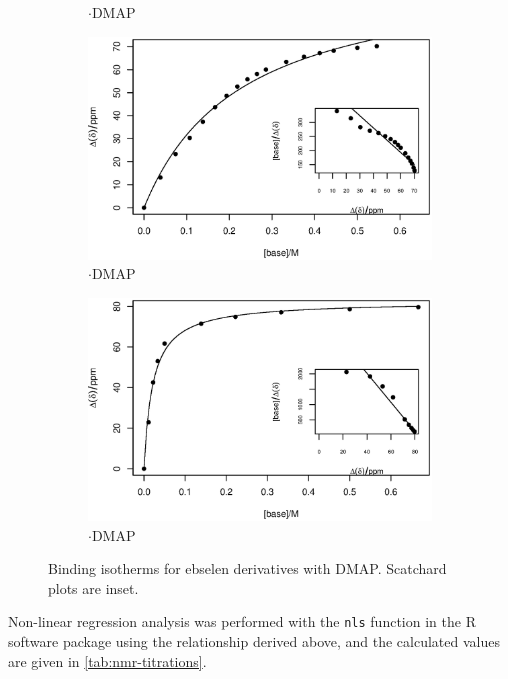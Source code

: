 \begin{refsection}
\begin{figure}
\begin{subfigure}{0.45\linewidth}
    \caption{$\cdot$DMAP}
  \end{subfigure}
  \begin{subfigure}{0.45\linewidth}
    \includegraphics[width=\linewidth]{Figures/nmr-titration/4br-ebs-dmap.eps}
    \caption{$\cdot$DMAP}
  \end{subfigure}
  \begin{subfigure}{0.45\linewidth}
    \includegraphics[width=\linewidth]{Figures/nmr-titration/4cn-ebs-dmap.eps}
    \caption{$\cdot$DMAP}
  \end{subfigure}
  \caption[NMR titration binding isotherms.]{Binding isotherms for ebselen derivatives  with DMAP. Scatchard plots are inset.}
  \label{fig:nmr-titrations}
\end{figure}

Non-linear regression analysis was performed with the \texttt{nls} function in the R software package using the relationship derived above, and the calculated values are given in \cref{tab:nmr-titrations}.\autocite{R}


\end{refsection}
